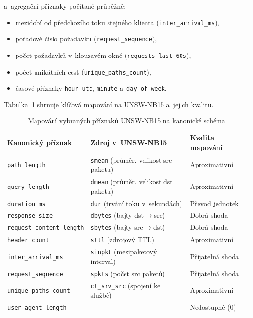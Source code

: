\noindent a~agregační příznaky počítané průběžně:

\begin{itemize}
\item mezidobí od předchozího toku stejného klienta (\texttt{inter\_arrival\_ms}),
\item pořadové číslo požadavku (\texttt{request\_sequence}),
\item počet požadavků v~klouzavém okně (\texttt{requests\_last\_60s}),
\item počet unikátních cest (\texttt{unique\_paths\_count}),
\item časové příznaky \texttt{hour\_utc}, \texttt{minute} a~\texttt{day\_of\_week}.
\end{itemize}

\noindent Tabulka~\ref{tab:feature-mapping} shrnuje klíčová mapování na UNSW-NB15 a~jejich kvalitu.

\begin{table}[htbp]
\centering
\caption{Mapování vybraných příznaků UNSW-NB15 na kanonické schéma}
\label{tab:feature-mapping}
\small
\begin{tabular}{lll}
\toprule
Kanonický příznak & Zdroj v~UNSW-NB15 & Kvalita mapování \\
\midrule
\texttt{path\_length}      & \texttt{smean} (průměr. velikost src paketu) & Aproximativní \\
\texttt{query\_length}     & \texttt{dmean} (průměr. velikost dst paketu) & Aproximativní \\
\texttt{duration\_ms}      & \texttt{dur} (trvání toku v~sekundách)      & Převod jednotek \\
\texttt{response\_size}    & \texttt{dbytes} (bajty dst$\rightarrow$src)  & Dobrá shoda \\
\texttt{request\_content\_length} & \texttt{sbytes} (bajty src$\rightarrow$dst) & Dobrá shoda \\
\texttt{header\_count}     & \texttt{sttl} (zdrojový TTL)                & Aproximativní \\
\texttt{inter\_arrival\_ms} & \texttt{sinpkt} (mezipaketový interval)     & Přijatelná shoda \\
\texttt{request\_sequence} & \texttt{spkts} (počet src paketů)           & Přijatelná shoda \\
\texttt{unique\_paths\_count} & \texttt{ct\_srv\_src} (spojení ke službě)  & Aproximativní \\
\texttt{user\_agent\_length} & --                                         & Nedostupné (0) \\
\bottomrule
\end{tabular}
\end{table}

